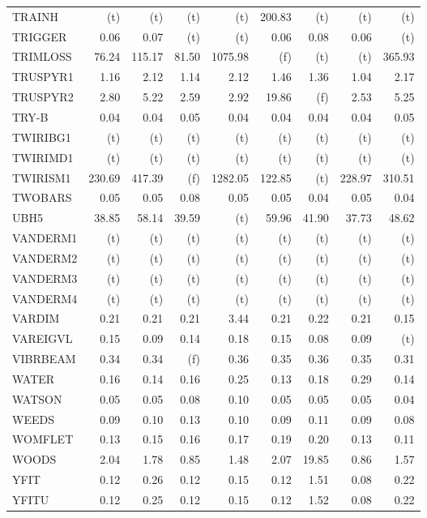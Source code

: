 \documentclass[11pt,twoside]{article}
\begin{document}
{\begin{longtable}[c]{|l|r|r|r|r|r|r|r|r|}
TRAINH & (t) & (t) & (t) & (t) & 200.83 & (t) & (t) & (t) \\
TRIGGER & 0.06 & 0.07 & (t) & (t) & 0.06 & 0.08 & 0.06 & (t) \\
TRIMLOSS & 76.24 & 115.17 & 81.50 & 1075.98 & (f) & (t) & (t) & 365.93 \\
TRUSPYR1 & 1.16 & 2.12 & 1.14 & 2.12 & 1.46 & 1.36 & 1.04 & 2.17 \\
TRUSPYR2 & 2.80 & 5.22 & 2.59 & 2.92 & 19.86 & (f) & 2.53 & 5.25 \\
TRY-B & 0.04 & 0.04 & 0.05 & 0.04 & 0.04 & 0.04 & 0.04 & 0.05 \\
TWIRIBG1 & (t) & (t) & (t) & (t) & (t) & (t) & (t) & (t) \\
TWIRIMD1 & (t) & (t) & (t) & (t) & (t) & (t) & (t) & (t) \\
TWIRISM1 & 230.69 & 417.39 & (f) & 1282.05 & 122.85 & (t) & 228.97 & 310.51 \\
TWOBARS & 0.05 & 0.05 & 0.08 & 0.05 & 0.05 & 0.04 & 0.05 & 0.04 \\
UBH5 & 38.85 & 58.14 & 39.59 & (t) & 59.96 & 41.90 & 37.73 & 48.62 \\
VANDERM1 & (t) & (t) & (t) & (t) & (t) & (t) & (t) & (t) \\
VANDERM2 & (t) & (t) & (t) & (t) & (t) & (t) & (t) & (t) \\
VANDERM3 & (t) & (t) & (t) & (t) & (t) & (t) & (t) & (t) \\
VANDERM4 & (t) & (t) & (t) & (t) & (t) & (t) & (t) & (t) \\
VARDIM & 0.21 & 0.21 & 0.21 & 3.44 & 0.21 & 0.22 & 0.21 & 0.15 \\
VAREIGVL & 0.15 & 0.09 & 0.14 & 0.18 & 0.15 & 0.08 & 0.09 & (t) \\
VIBRBEAM & 0.34 & 0.34 & (f) & 0.36 & 0.35 & 0.36 & 0.35 & 0.31 \\
WATER & 0.16 & 0.14 & 0.16 & 0.25 & 0.13 & 0.18 & 0.29 & 0.14 \\
WATSON & 0.05 & 0.05 & 0.08 & 0.10 & 0.05 & 0.05 & 0.05 & 0.04 \\
WEEDS & 0.09 & 0.10 & 0.13 & 0.10 & 0.09 & 0.11 & 0.09 & 0.08 \\
WOMFLET & 0.13 & 0.15 & 0.16 & 0.17 & 0.19 & 0.20 & 0.13 & 0.11 \\
WOODS & 2.04 & 1.78 & 0.85 & 1.48 & 2.07 & 19.85 & 0.86 & 1.57 \\
YFIT & 0.12 & 0.26 & 0.12 & 0.15 & 0.12 & 1.51 & 0.08 & 0.22 \\
YFITU & 0.12 & 0.25 & 0.12 & 0.15 & 0.12 & 1.52 & 0.08 & 0.22 \\

\end{longtable}}
\end{document}
